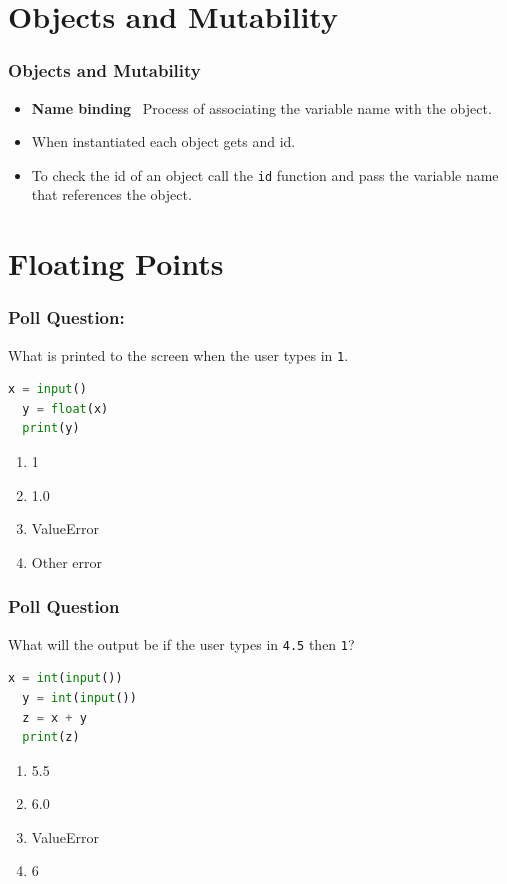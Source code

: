\documentclass{beamer}
\begin{document}
\section{Objects and Mutability}

%
%
%
\begin{frame}[fragile]
  \frametitle{Objects and Mutability}
  \begin{itemize}
    \item \textbf{Name binding} \textrightarrow \ Process of associating the variable name with the object.
    \item When instantiated each object gets and id.
    \item To check the id of an object call the \lstinline|id| function and pass the variable name that references the object.
  \end{itemize}
\end{frame}


\section{Floating Points}
%
%
%
\begin{frame}[fragile]
  \frametitle{Poll Question: }
  What is printed to the screen when the user types in \lstinline|1|.
  \begin{lstlisting}[language=Python]
  x = input()
  y = float(x)
  print(y)
  \end{lstlisting}
  \vfill
  \begin{enumerate}[A]
    \item 1
    \item 1.0
    \item ValueError
    \item Other error
  \end{enumerate}
\end{frame}


%
%
%
\begin{frame}[fragile]
  \frametitle{Poll Question}
  What will the output be if the user types in \lstinline|4.5| then \lstinline|1|?
  \begin{lstlisting}[language=Python]
  x = int(input())
  y = int(input())
  z = x + y
  print(z)
  \end{lstlisting}
  \vfill
  \begin{enumerate}[A]
    \item 5.5
    \item 6.0
    \item ValueError
    \item 6
  \end{enumerate}
\end{frame}
\end{document}
